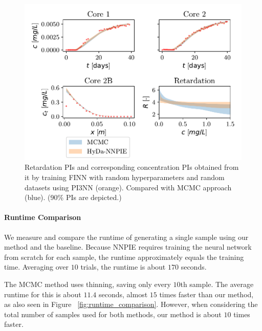 \begin{figure}[h!]
    \centering
    \includegraphics{figs/finn_MCMCvsFull-SPAN_PIs.pdf}
    \caption{Retardation PIs and corresponding concentration PIs obtained from it by training FINN with random hyperparameters and random datasets using PI3NN (orange). Compared with MCMC approach (blue). (90\% PIs are depicted.)}
    \label{fig:mcmc_vs_fullspan}
\end{figure}




\paragraph{Runtime Comparison}
We measure and compare the runtime of generating a single sample using our method and the baseline. Because NNPIE requires training the neural network from scratch for each sample, the runtime approximately equals the training time. Averaging over $10$ trials, the runtime is about $170$ seconds.

The MCMC method uses thinning, saving only every $10$th sample. The average runtime for this is about $11.4$ seconds, almost $15$ times faster than our method, as also seen in Figure ~\vref{fig:runtime_comparison}.
However, when considering the total number of samples used for both methods, our method is about $10$ times faster.

